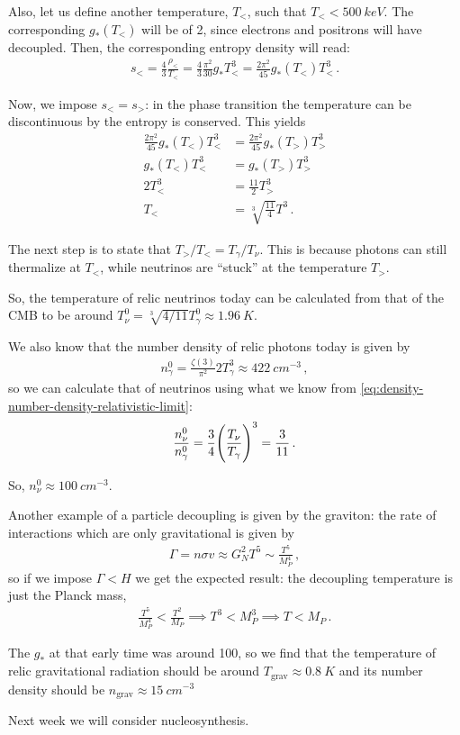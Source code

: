 \documentclass[main.tex]{subfiles}
\begin{document}
Also, let us define another temperature, \(T_<\), such that \(T_< < \SI{500}{keV}\). The corresponding \(g_* (T_<)\) will be of 2, since electrons and positrons will have decoupled. 
Then, the corresponding entropy density will read: 
%
\begin{align}
s_< = \frac{4}{3} \frac{\rho_{<}}{T_<} = \frac{4}{3} \frac{\pi^2}{30} g_* T_<^3 = \frac{2 \pi^2}{45} g_*(T_<) T_<^3
\,.
\end{align}

Now, we impose \(s_< = s_>\): in the phase transition the temperature can be discontinuous by the entropy is conserved. This yields 
%
\begin{align}
\frac{2 \pi^2}{45} g_*(T_<) T_<^3 &= \frac{2 \pi^2}{45} g_* (T_>) T^3_> \\
g_*(T_<) T_<^3 &= g_* (T_>) T^3_> \\
2 T_<^3 &= \frac{11}{2} T^3_> \\
T_< &= \sqrt[3]{\frac{11}{4}} T^3 
\,.
\end{align}

The next step is to state that \(T_> / T_< = T_\gamma / T_\nu \). This is because photons can still thermalize at \(T_<\), while neutrinos are ``stuck'' at the temperature \(T_>\).

So, the temperature of relic neutrinos today can be calculated from that of the CMB to be around \(T^{0}_{\nu } = \sqrt[3]{4/11} T^{0}_{\gamma } \approx \SI{1.96}{K}\). 

We also know that the number density of relic photons today is given by 
%
\begin{align}
n^{0}_{\gamma } = \frac{\zeta (3)}{\pi^2} 2 T_\gamma^3 \approx \SI{422}{cm^{-3}}
\,,
\end{align}
%
so we can calculate that of neutrinos using what we know from \eqref{eq:density-number-density-relativistic-limit}: 
%
\begin{align}
\frac{n^{0}_{\nu }}{n^{0}_{\gamma }} = \frac{3}{4} \qty( \frac{T_\nu}{T_\gamma } )^3 = \frac{3}{11}
\,.
\end{align}

So, \(n^{0}_{\nu } \approx \SI{100}{cm^{-3}}\).

Another example of a particle decoupling is given by the graviton: the rate of interactions which are only gravitational is given by 
%
\begin{align}
\Gamma = n \sigma v \approx G_N^2 T^{5} \sim \frac{T^{5}}{M_P^{4}}
\,,
\end{align}
%
so if we impose \(\Gamma < H \) we get the expected result: the decoupling temperature is just the Planck mass, 
%
\begin{align}
\frac{T^{5}}{M_P^{4}} < \frac{T^2}{M_P} \implies T^{3} < M_P^{3} \implies T < M_P
\,.
\end{align}

The \(g_*\) at that early time was around 100, so we find that the temperature of relic gravitational radiation should be around \(T _{\text{grav}} \approx \SI{0.8}{K}\) and its number density should be \(n _{\text{grav}} \approx \SI{15}{cm^{-3}}\)

Next week we will consider nucleosynthesis. 
\end{document}
